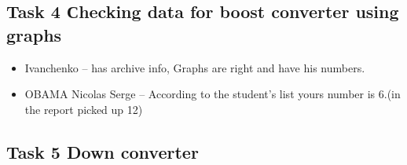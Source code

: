 \documentclass[a4paper,landscape,11pt]{article}
\begin{document}
\subsection{Task 4 Сhecking data for boost converter using graphs}
\begin{itemize}
\item Ivanchenko -- has archive info, Graphs are right and have his numbers.

\item OBAMA Nicolas Serge -- According to the student's list yours number is 6.(in the report picked up 12)

\end{itemize}

\subsection{Task 5 Down converter}
\end{document}
